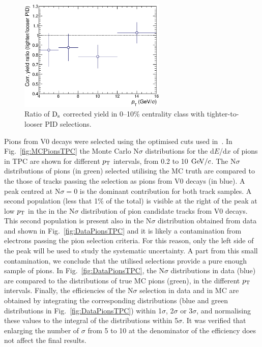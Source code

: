 \begin{figure}[!h]
 \centering
 \includegraphics[angle=0, width=7cm]{./FigCap5/PIDsyst_010.eps}
 \caption{Ratio of ${\rm D_s}$ corrected yield in 0--10\% centrality class with tighter-to-looser PID selections.}
 \label{fig:DsPID010} 
\end{figure}
Pions from V0 decays were selected using the optimised cuts
used in~\cite{Schuchmann:2102194}. In Fig.~\ref{fig:MCPionsTPC} the Monte Carlo 
N$\sigma$ distributions for the d$E$/d$x$ of pions in TPC are shown for 
different $p_{\rm T}$ intervals, from 0.2 to 10 $\mathrm{GeV}/c$.
The N$\sigma$ distributions of pions (in green) selected utilising the MC truth are compared to the
those of tracks passing the selection as pions from V0 decays 
(in blue). A peak centred at N$\sigma=0$ is the dominant contribution for both
track samples.
A second population (less that 1\% of the total) is visible at the right of the peak at low $p_{\rm T}$ in the in the N$\sigma$ distribution
of pion candidate tracks from V0 decays. This second population is present
also in the N$\sigma$ distribution obtained from data and shown in
Fig.~\ref{fig:DataPionsTPC} and it is likely a contamination from electrons passing
the pion selection criteria. For this reason, 
only the left side of the peak will be used to study the systematic uncertainty.
A part from this small contamination, we conclude that the utilised selections provide a pure
enough sample of pions. 
In Fig.~\ref{fig:DataPionsTPC}, the N$\sigma$ distributions in data (blue) are compared
to the distributions of true MC pions (green), in the different $p_{\rm T}$ intervals.  
Finally, the efficiencies of the N$\sigma$ selection in data and in MC are obtained by integrating the corresponding 
distributions (blue and green distributions in Fig.~\ref{fig:DataPionsTPC})
within 1$\sigma$, 2$\sigma$ or 3$\sigma$, and normalising these values to the integral 
of the distributions within 5$\sigma$. It was verified that enlarging the number of $\sigma$ from 5 to 10 at the 
denominator of the efficiency does not affect the final results.
